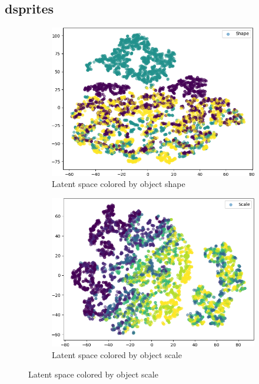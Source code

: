 \documentclass[11pt]{article}
\begin{document}
\subsection{dsprites}
\begin{figure}[H]
\centering
\begin{subfigure}{.19\textwidth}
\includegraphics[width=\textwidth]{images/latent_spaces/dsprites/vae_gan/embeddings_mu_0.png}
\caption{Latent space colored by object shape}
\end{subfigure}
\hfill
\begin{subfigure}{.19\textwidth}
\includegraphics[width=\textwidth]{images/latent_spaces/dsprites/vae_gan/embeddings_mu_1.png}
\caption{Latent space colored by object scale}
\label{subfig:vae_embedding_dsprites_scale}

\end{subfigure}
\end{figure}
\end{document}
